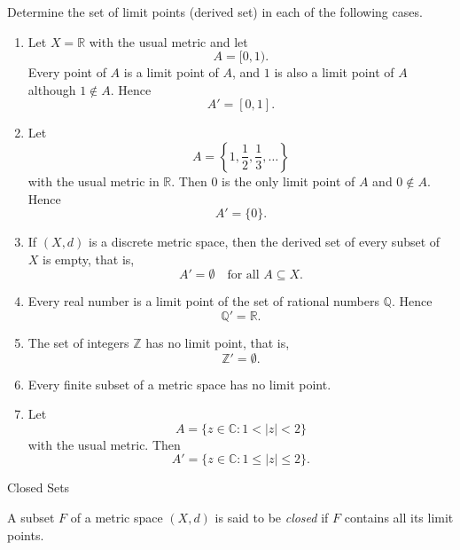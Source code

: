 \documentclass[12pt, a4paper]{article}
\begin{document}
\begin{problem}
Determine the set of limit points (derived set) in each of the following cases.

\begin{enumerate}
    \item Let $X=\mathbb{R}$ with the usual metric and let
    \[
    A=[0,1).
    \]
    Every point of $A$ is a limit point of $A$, and $1$ is also a limit point of $A$ although
    $1\notin A$. Hence
    \[
    A'=[0,1].
    \]

    \item Let
    \[
    A=\left\{1,\frac12,\frac13,\dots\right\}
    \]
    with the usual metric in $\mathbb{R}$. Then $0$ is the only limit point of $A$ and
    $0\notin A$. Hence
    \[
    A'=\{0\}.
    \]

    \item If $(X,d)$ is a discrete metric space, then the derived set of every subset of $X$
    is empty, that is,
    \[
    A'=\emptyset \quad \text{for all } A\subseteq X.
    \]

    \item Every real number is a limit point of the set of rational numbers $\mathbb{Q}$.
    Hence
    \[
    \mathbb{Q}'=\mathbb{R}.
    \]

    \item The set of integers $\mathbb{Z}$ has no limit point, that is,
    \[
    \mathbb{Z}'=\emptyset.
    \]

    \item Every finite subset of a metric space has no limit point.

    \item Let
    \[
    A=\{z\in\mathbb{C} : 1<|z|<2\}
    \]
    with the usual metric. Then
    \[
    A'=\{z\in\mathbb{C} : 1\le |z|\le 2\}.
    \]
\end{enumerate}
\end{problem}

\clearpage

\begin{heading}
    Closed Sets
\end{heading}

\vspace{10pt}

\begin{definition}
A subset $F$ of a metric space $(X,d)$ is said to be \emph{closed} if $F$ contains all its
limit points.
\end{definition}
\end{document}
